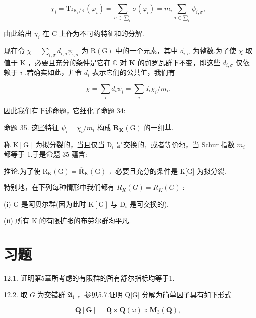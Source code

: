 \documentclass[10pt]{article}
\begin{document}
\[
{\chi }_{i} = {\mathrm{{Tr}}}_{{\mathrm{K}}_{i}/\mathrm{K}}\left( {\varphi }_{i}\right)  = \mathop{\sum }\limits_{{\sigma  \in  {\sum }_{i}}}\sigma \left( {\varphi }_{i}\right)  = {m}_{i}\mathop{\sum }\limits_{{\sigma  \in  {\sum }_{i}}}{\psi }_{i,\sigma },
\]

由此给出 \({\chi }_{i}\) 在 C 上作为不可约特征和的分解.

现在令 \(\chi  = \mathop{\sum }\limits_{{i,\sigma }}{d}_{i,\sigma }{\psi }_{i,\sigma }\) 为 \(\mathrm{R}\left( \mathrm{G}\right)\) 中的一个元素，其中 \({d}_{i,\sigma }\) 为整数.为了使 \(\chi\) 取值于 \(\mathrm{K}\) ，必要且充分的条件是它在 \(\mathbb{C}\) 对 \(\mathbf{K}\) 的伽罗瓦群下不变，即这些 \({d}_{i,\sigma }\) 仅依赖于 \(i\) .若确实如此，并令 \({d}_{i}\) 表示它们的公共值，我们有

\[
\chi  = \mathop{\sum }\limits_{i}{d}_{i}{\psi }_{i} = \mathop{\sum }\limits_{i}{d}_{i}{\chi }_{i}/{m}_{i}.
\]

因此我们有下述命题，它细化了命题 34:

命题 35. 这些特征 \({\psi }_{i} = {\chi }_{i}/{m}_{i}\) 构成 \({\overline{\mathbf{R}}}_{\mathbf{K}}\left( \mathrm{G}\right)\) 的一组基.

称 \(\mathrm{K}\left\lbrack  \mathrm{G}\right\rbrack\) 为拟分裂的，当且仅当 \({\mathrm{D}}_{i}\) 是交换的，或者等价地，当 Schur 指数 \({m}_{i}\) 都等于 1.于是命题 35 蕴含:

推论.为了使 \({\mathrm{R}}_{\mathrm{K}}\left( \mathrm{G}\right)  = {\overline{\mathbf{R}}}_{\mathrm{K}}\left( \mathrm{G}\right)\) ，必要且充分的条件是 K[G] 为拟分裂.

特别地，在下列每种情形中我们都有 \({R}_{K}\left( G\right)  = {\bar{R}}_{K}\left( G\right)\) :

(i) \(\mathrm{G}\) 是阿贝尔群(因为此时 \(\mathrm{K}\left\lbrack  \mathrm{G}\right\rbrack\) 与 \({\mathrm{D}}_{i}\) 是可交换的).

(ii) 所有 \(\mathrm{K}\) 的有限扩张的布劳尔群均平凡.

\section*{习题}

12.1. 证明第5章所考虑的有限群的所有舒尔指标均等于1.

12.2. 取 \(G\) 为交错群 \({\mathfrak{A}}_{4}\) ，参见5.7.证明 Q[G] 分解为简单因子具有如下形式

\[
\mathbf{Q}\left\lbrack  \mathbf{G}\right\rbrack   = \mathbf{Q} \times  \mathbf{Q}\left( \omega \right)  \times  {\mathbf{M}}_{3}\left( \mathbf{Q}\right) ,
\]
\end{document}
